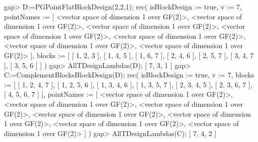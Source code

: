 \beginexample
gap> D:=PGPointFlatBlockDesign(2,2,1);
rec( isBlockDesign := true, v := 7, 
  pointNames := [ <vector space of dimension 1 over GF(2)>, 
      <vector space of dimension 1 over GF(2)>, 
      <vector space of dimension 1 over GF(2)>, 
      <vector space of dimension 1 over GF(2)>, 
      <vector space of dimension 1 over GF(2)>, 
      <vector space of dimension 1 over GF(2)>, 
      <vector space of dimension 1 over GF(2)> ], 
  blocks := [ [ 1, 2, 3 ], [ 1, 4, 5 ], [ 1, 6, 7 ], [ 2, 4, 6 ], 
      [ 2, 5, 7 ], [ 3, 4, 7 ], [ 3, 5, 6 ] ] )
gap> AllTDesignLambdas(D);
[ 7, 3, 1 ]
gap> C:=ComplementBlocksBlockDesign(D);
rec( isBlockDesign := true, v := 7, 
  blocks := [ [ 1, 2, 4, 7 ], [ 1, 2, 5, 6 ], [ 1, 3, 4, 6 ], [ 1, 3, 5, 7 ], 
      [ 2, 3, 4, 5 ], [ 2, 3, 6, 7 ], [ 4, 5, 6, 7 ] ], 
  pointNames := [ <vector space of dimension 1 over GF(2)>, 
      <vector space of dimension 1 over GF(2)>, 
      <vector space of dimension 1 over GF(2)>, 
      <vector space of dimension 1 over GF(2)>, 
      <vector space of dimension 1 over GF(2)>, 
      <vector space of dimension 1 over GF(2)>, 
      <vector space of dimension 1 over GF(2)> ] )
gap> AllTDesignLambdas(C);
[ 7, 4, 2 ]
\endexample


